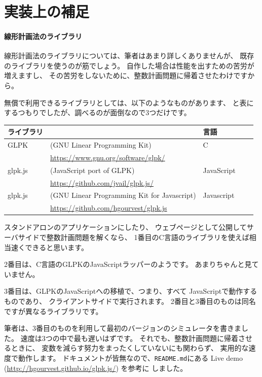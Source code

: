 \documentclass{jsarticle}
\begin{document}
\section{実装上の補足}
\paragraph{線形計画法のライブラリ}
線形計画法のライブラリについては、筆者はあまり詳しくありませんが、
既存のライブラリを使うのが筋でしょう。
自作した場合は性能を出すための苦労が増えますし、
その苦労をしないために、整数計画問題に帰着させたわけですから。

無償で利用できるライブラリとしては、以下のようなものがあります、
と表にするつもりでしたが、調べるのが面倒なので3つだけです。
%
\begin{center}
\begin{tabular}{lllll}
\toprule
ライブラリ & & 言語 \\
\midrule
GLPK & (GNU Linear Programming Kit) & C \\
& \url{https://www.gnu.org/software/glpk/}
\\
glpk.js & (JavaScript port of GLPK) & JavaScript \\
& \url{https://github.com/jvail/glpk.js/}
\\
glpk.js & (GNU Linear Programming Kit for Javascript) & Javascript \\
& \url{https://github.com/hgourvest/glpk.js}
\\ \bottomrule
\end{tabular}
\end{center}

スタンドアロンのアプリケーションにしたり、
ウェブページとして公開してサーバサイドで整数計画問題を解くなら、
1番目のC言語のライブラリを使えば相当速くできると思います。

2番目は、C言語のGLPKのJavaScriptラッパーのようです。
あまりちゃんと見ていません。

3番目は、GLPKのJavaScriptへの移植で、つまり、すべて
JavaScriptで動作するものであり、
クライアントサイドで実行されます。
2番目と3番目のものは同名ですが異なるライブラリです。

筆者は、3番目のものを利用して最初のバージョンのシミュレータを書きました。
速度は3つの中で最も遅いはずです。
それでも、整数計画問題に帰着させるときに、
変数を減らす努力をまったくしていないにも関わらず、
実用的な速度で動作します。
ドキュメントが皆無なので、\texttt{README.md}にある
Live demo (\url{http://hgourvest.github.io/glpk.js/}) を参考に
しました。
\end{document}
